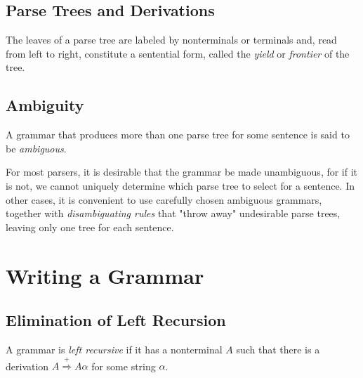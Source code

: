 \documentclass[12pt,a4paper,twoside,openany]{book}
\begin{document}
\subsection{Parse Trees and Derivations}

The leaves of a parse tree are labeled by nonterminals or terminals and, read from left to right, constitute a sentential form, called the \textit{yield} or \textit{frontier} of the tree.

\subsection{Ambiguity}

A grammar that produces more than one parse tree for some sentence is said to be \textit{ambiguous}.

For most parsers, it is desirable that the grammar be made unambiguous, for if it is not, we cannot uniquely determine which parse tree to select for a sentence. In other cases, it is convenient to use carefully chosen ambiguous grammars, together with \textit{disambiguating rules} that "throw away" undesirable parse trees, leaving only one tree for each sentence.

\section{Writing a Grammar}
\subsection{Elimination of Left Recursion}

A grammar is \textit{left recursive} if it has a nonterminal $A$ such that there is a derivation $A\overset{+}{\Rightarrow}A\alpha$ for some string $\alpha$.

\end{document}
